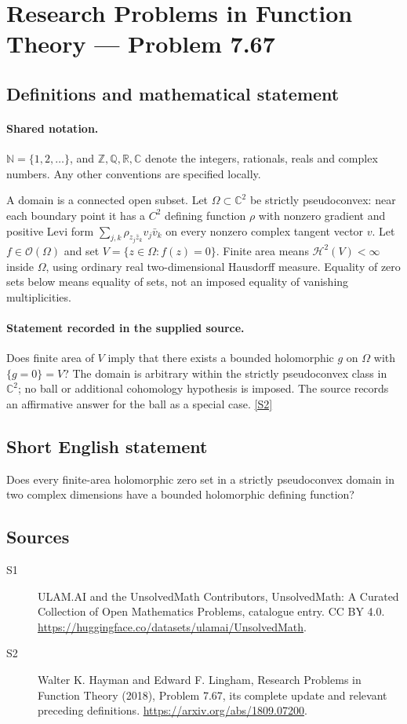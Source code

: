 \documentclass[11pt]{article}
\newcommand{\sref}[2]{\hyperlink{source:#1:#2}{[S#2]}}
\begin{document}
\section{Research Problems in Function Theory — Problem 7.67}\label{statement}

\subsection{Definitions and mathematical statement}

\paragraph{Shared notation.}$\mathbb N=\{1,2,\ldots\}$, and $\mathbb Z,\mathbb Q,\mathbb R,\mathbb C$ denote the integers, rationals, reals and complex numbers. Any other conventions are specified locally.


A domain is a connected open subset. Let $\Omega\subset\mathbb C^2$ be strictly pseudoconvex: near each boundary point it has a $C^2$ defining function $\rho$ with nonzero gradient and positive Levi form $\sum_{j,k}\rho_{z_j\bar z_k}v_j\bar v_k$ on every nonzero complex tangent vector $v$. Let $f\in\mathcal O(\Omega)$ and set $V=\{z\in\Omega:f(z)=0\}$. Finite area means $\mathcal H^2(V)<\infty$ inside $\Omega$, using ordinary real two-dimensional Hausdorff measure. Equality of zero sets below means equality of sets, not an imposed equality of vanishing multiplicities.
\paragraph{Statement recorded in the supplied source.}
Does finite area of $V$ imply that there exists a bounded holomorphic $g$ on $\Omega$ with $\{g=0\}=V$? The domain is arbitrary within the strictly pseudoconvex class in $\mathbb C^2$; no ball or additional cohomology hypothesis is imposed. The source records an affirmative answer for the ball as a special case. \sref{statement}{2}
\subsection{Short English statement}
Does every finite-area holomorphic zero set in a strictly pseudoconvex domain in two complex dimensions have a bounded holomorphic defining function?
\subsection{Sources}
\begin{description}
\item[\hypertarget{source:statement:1}{S1}] ULAM.AI and the UnsolvedMath Contributors, UnsolvedMath: A Curated Collection of Open Mathematics Problems, catalogue entry. CC BY 4.0. \url{https://huggingface.co/datasets/ulamai/UnsolvedMath}.
\item[\hypertarget{source:statement:2}{S2}] Walter K. Hayman and Edward F. Lingham, Research Problems in Function Theory (2018), Problem 7.67, its complete update and relevant preceding definitions. \url{https://arxiv.org/abs/1809.07200}.
\end{description}
\label{end:statement}
\end{document}
